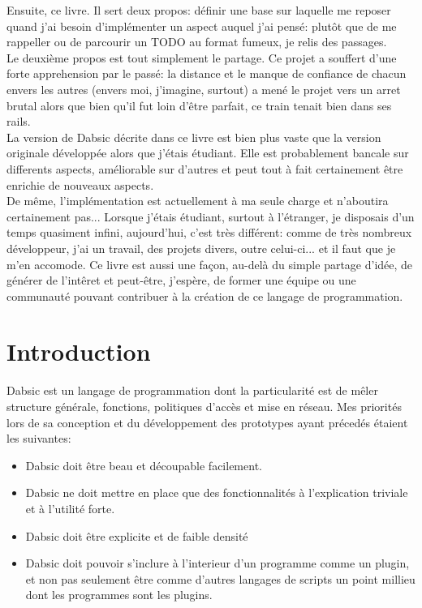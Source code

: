 \documentclass[a5paper, 12pt]{book}
\begin{document}
Ensuite, ce livre. Il sert deux propos: définir une base
sur laquelle me reposer quand j'ai besoin d'implémenter un
aspect auquel j'ai pensé: plutôt que de me rappeller ou
de parcourir un TODO au format fumeux, je relis des passages.\\

Le deuxième propos est tout simplement le partage. Ce projet
a souffert d'une forte apprehension par le passé: la distance
et le manque de confiance de chacun envers les autres (envers
moi, j'imagine, surtout) a mené le projet vers un arret
brutal alors que bien qu'il fut loin d'être parfait, ce train
tenait bien dans ses rails.\\

La version de Dabsic décrite dans ce livre est bien plus
vaste que la version originale développée alors que j'étais
étudiant. Elle est probablement bancale sur differents aspects,
améliorable sur d'autres et peut tout à fait certainement
être enrichie de nouveaux aspects.\\

De même, l'implémentation est actuellement à ma seule
charge et n'aboutira certainement pas...
Lorsque j'étais étudiant, surtout à l'étranger,
je disposais d'un temps quasiment infini, aujourd'hui, c'est
très différent: comme de très nombreux développeur, j'ai un
travail, des projets divers, outre celui-ci... et il faut
que je m'en accomode. Ce livre est aussi une façon, au-delà
du simple partage d'idée, de générer de l'intêret et peut-être,
j'espère, de former une équipe ou une communauté pouvant
contribuer à la création de ce langage de programmation.\\

\newpage


\chapter{Introduction}

Dabsic est un langage de programmation dont la particularité
est de mêler structure générale, fonctions, politiques d'accès
et mise en réseau. Mes priorités lors de sa conception et du
développement des prototypes ayant précedés étaient les suivantes:\\

\begin{itemize}
  \item Dabsic doit être beau et découpable facilement.
  \item Dabsic ne doit mettre en place que des fonctionnalités à
    l'explication triviale et à l'utilité forte.
  \item Dabsic doit être explicite et de faible densité
  \item Dabsic doit pouvoir s'inclure à l'interieur d'un
    programme comme un plugin, et non pas seulement être comme
    d'autres langages de scripts un point millieu dont les
    programmes sont les plugins.
\end{itemize}
\end{document}
